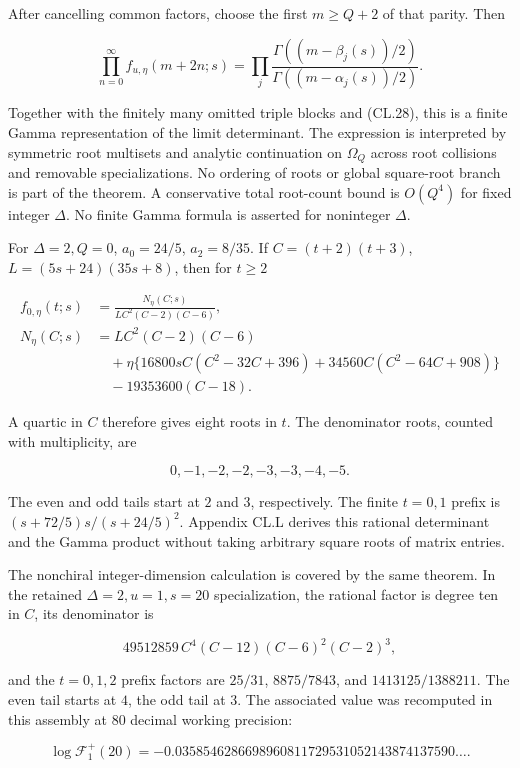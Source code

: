 \documentclass[a4paper,11pt]{article}
\numberwithin{equation}{section}
\begin{document}
After cancelling common factors, choose the first \(m\geq Q+2\) of that parity. Then

\[
\prod_{n=0}^{\infty}f_{u,\eta}(m+2n;s)
=\prod_j\frac{\Gamma((m-\beta_j(s))/2)}
{\Gamma((m-\alpha_j(s))/2)}.
\tag{CL.30}
\]

Together with the finitely many omitted triple blocks and (CL.28), this is a finite Gamma representation of the limit determinant. The expression is interpreted by symmetric root multisets and analytic continuation on \(\Omega_Q\) across root collisions and removable specializations. No ordering of roots or global square-root branch is part of the theorem. A conservative total root-count bound is \(O(Q^4)\) for fixed integer \(\Delta\). No finite Gamma formula is asserted for noninteger \(\Delta\).

For \(\Delta=2,Q=0\), \(a_0=24/5\), \(a_2=8/35\). If \(C=(t+2)(t+3)\), \(L=(5s+24)(35s+8)\), then for \(t\geq2\)

\[
\begin{aligned}
f_{0,\eta}(t;s)&=\frac{N_\eta(C;s)}{LC^2(C-2)(C-6)},\\
N_\eta(C;s)&=LC^2(C-2)(C-6)\\
&\quad+\eta\{16800sC(C^2-32C+396)
+34560C(C^2-64C+908)\}\\
&\quad-19353600(C-18).
\end{aligned}
\tag{CL.31}
\]

A quartic in \(C\) therefore gives eight roots in \(t\). The denominator roots, counted with multiplicity, are

\[0,-1,-2,-2,-3,-3,-4,-5.\]

The even and odd tails start at \(2\) and \(3\), respectively. The finite \(t=0,1\) prefix is \((s+72/5)s/(s+24/5)^2\). Appendix CL.L derives this rational determinant and the Gamma product without taking arbitrary square roots of matrix entries.

The nonchiral integer-dimension calculation is covered by the same theorem. In the retained \(\Delta=2,u=1,s=20\) specialization, the rational factor is degree ten in \(C\), its denominator is

\[
49512859\,C^4(C-12)(C-6)^2(C-2)^3,
\]

and the \(t=0,1,2\) prefix factors are \(25/31\), \(8875/7843\), and \(1413125/1388211\). The even tail starts at \(4\), the odd tail at \(3\). The associated value was recomputed in this assembly at 80 decimal working precision:

\[
\log\mathcal F_1^+(20)
=-0.0358546286698960811729531052143874137590\ldots.
\]
\end{document}
